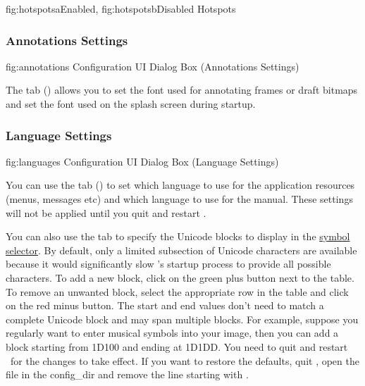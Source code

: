 {
 {fig:hotspotsa}{}{Enabled},
 {fig:hotspotsb}{}{Disabled}
}
{Hotspots}


\subsubsection{Annotations Settings}\label{sec:annotations}


\FloatFig
  {fig:annotations}
  {}
  {Configuration UI Dialog Box (Annotations Settings)}

The  tab ()
allows you to set the font used for annotating frames or draft
\glspl{bitmap} and set the font used on the splash screen during startup.


\subsubsection{Language Settings}\label{sec:languages}


\FloatFig
  {fig:languages}
  {}
  {Configuration UI Dialog Box (Language Settings)}

You can use the  tab
()
to set which language to use for the application
resources (menus, messages etc) and which language to use for
the manual. These settings will not be applied until you quit and
restart \FlowframTk.

You can also use the  tab to specify the
Unicode blocks to display in the
\hyperref[mi:insertsymbol]{symbol selector}. By default, only
a limited subsection of Unicode characters are available because it
would significantly slow \FlowframTk's startup process to provide
all possible characters. To add a new block, \gls{click} on the
green plus button next to the table. To remove an unwanted block,
select the appropriate row in the table and \gls{click} on the red minus
button. The start and end values don't need to match a complete
Unicode block and may span multiple blocks. For example, suppose you
regularly want to enter musical symbols into your image, then you
can add a block starting from 1D100 and ending at 1D1DD. You need to
quit and restart \FlowframTk\ for the changes to take effect. If you
want to restore the defaults, quit \FlowframTk, open the file
 in the \gls{config_dir} and remove
the line starting with .

